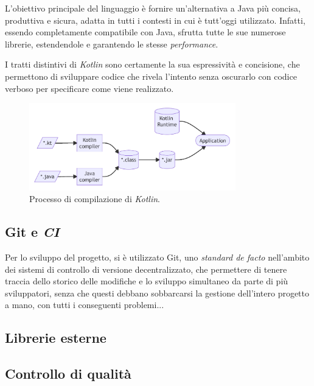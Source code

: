 L'obiettivo principale del linguaggio è fornire un'alternativa a Java più concisa, produttiva e sicura, adatta in tutti i contesti in cui è tutt'oggi utilizzato.
%
Infatti, essendo completamente compatibile con Java, sfrutta tutte le sue numerose librerie, estendendole e garantendo le stesse \textit{performance}.

I tratti distintivi di \textit{Kotlin} sono certamente la sua espressività e concisione, che permettono di sviluppare codice che rivela l'intento senza oscurarlo con codice verboso per specificare come viene realizzato.

\begin{figure}[h]
    \centering
    \includegraphics[width=0.8\textwidth]{resources/img/03-kotlincompilation.pdf}
    \caption{Processo di compilazione di \textit{Kotlin}.}
    \label{img:03-kotlin-compilation}
\end{figure}

\subsection*{Git e \textit{CI}}
Per lo sviluppo del progetto, si è utilizzato Git, uno \textit{standard de facto} nell'ambito dei sistemi di controllo di versione decentralizzato, che permettere di tenere traccia dello storico delle modifiche e lo sviluppo simultaneo da parte di più sviluppatori, senza che questi debbano sobbarcarsi la gestione dell'intero progetto a mano, con tutti i conseguenti problemi...

\subsection*{Librerie esterne}

\subsection*{Controllo di qualità}
